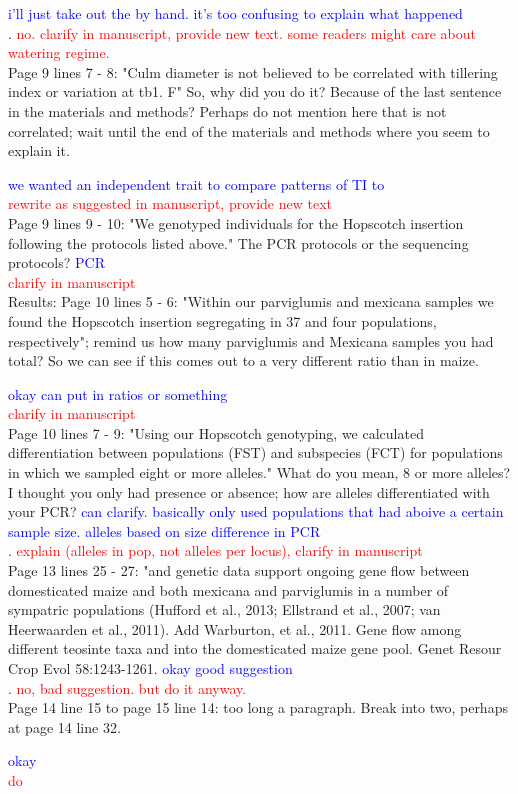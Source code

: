 \documentclass[11pt]{article}
\newcommand{\res}[1]{\noindent \textcolor{blue}{{#1}} \\}
\newcommand{\jri}[1]{\noindent \textcolor{red}{{#1}} \\}
\begin{document}
\res{i'll just take out the by hand. it's too confusing to explain what happened}. 
\jri{no. clarify in manuscript, provide new text. some readers might care about watering regime.}

Page 9 lines 7 - 8: "Culm diameter is not believed to be correlated with tillering index or variation at tb1. F" So, why did you do it? Because of the last sentence in the materials and methods? Perhaps do not mention here that is not correlated; wait until the end of the materials and methods where you seem to explain it. 

\res{we wanted an independent trait to compare patterns of TI to}
\jri{rewrite as suggested in manuscript, provide new text}

Page 9 lines 9 - 10: "We genotyped individuals for the Hopscotch insertion following the protocols listed above." The PCR protocols or the sequencing protocols? \res{PCR}
\jri{clarify in manuscript}

Results:
Page 10 lines 5 - 6: "Within our parviglumis and mexicana samples we found the Hopscotch insertion segregating in 37 and four populations, respectively"; remind us how many parviglumis and Mexicana samples you had total? So we can see if this comes out to a very different ratio than in maize. 

\res{okay can put in ratios or something}
\jri{clarify in manuscript}

Page 10 lines 7 - 9: "Using our Hopscotch genotyping, we calculated diﬀerentiation between populations (FST) and subspecies (FCT) for populations in which we sampled eight or more alleles." What do you mean, 8 or more alleles? I thought you only had presence or absence; how are alleles differentiated with your PCR? \res{can clarify. basically only used populations that had aboive a certain sample size. alleles based on size difference in PCR}. 
\jri{explain (alleles in pop, not alleles per locus), clarify in manuscript}

Page 13 lines 25 - 27: "and genetic data support ongoing gene ﬂow between domesticated maize and both mexicana and parviglumis in a number of sympatric populations (Huﬀord et al., 2013; Ellstrand et al., 2007; van Heerwaarden et al., 2011). Add Warburton, et al., 2011.  Gene flow among different teosinte taxa and into the domesticated maize gene pool.  Genet Resour Crop Evol 58:1243-1261. \res{okay good suggestion}. 
\jri{no, bad suggestion. but do it anyway.}

Page 14 line 15 to page 15 line 14: too long a paragraph. Break into two, perhaps at page 14 line 32. 

\res{okay}
\jri{do}
\end{document}
